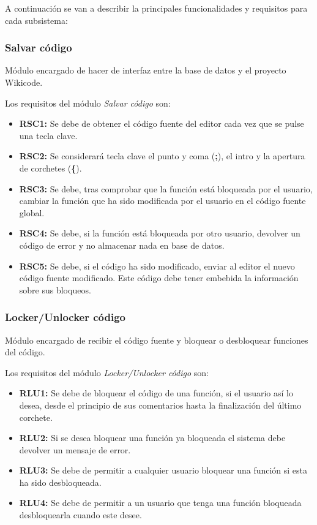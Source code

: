 A continuación se van a describir la principales funcionalidades y requisitos para cada subsistema:

\subsubsection{Salvar código}

Módulo encargado de hacer de interfaz entre la base de datos y el proyecto Wikicode. 

Los requisitos del módulo \emph{Salvar código} son:

\begin{itemize}
	\item \textbf{RSC1:} Se debe de obtener el código fuente del editor cada vez que se pulse una tecla clave.
	\item \textbf{RSC2:} Se considerará tecla clave el punto y coma (\textbf{;}), el intro y la apertura de corchetes (\textbf{\{}).
	\item \textbf{RSC3:} Se debe, tras comprobar que la función está bloqueada por el usuario, cambiar la función que ha sido modificada por el usuario en el código fuente global.
	\item \textbf{RSC4:} Se debe, si la función está bloqueada por otro usuario, devolver un código de error y no almacenar nada en base de datos.
	\item \textbf{RSC5:} Se debe, si el código ha sido modificado, enviar al editor el nuevo código fuente modificado. Este código debe tener embebida la información sobre sus bloqueos.
\end{itemize}

\subsubsection{Locker/Unlocker código}

Módulo encargado de recibir el código fuente y bloquear o desbloquear funciones del código.

Los requisitos del módulo \emph{Locker/Unlocker código} son:

\begin{itemize}
	\item \textbf{RLU1:} Se debe de bloquear el código de una función, si el usuario así lo desea, desde el principio de sus comentarios hasta la finalización del último corchete.
	\item \textbf{RLU2:} Si se desea bloquear una función ya bloqueada el sistema debe devolver un mensaje de error.
	\item \textbf{RLU3:} Se debe de permitir a cualquier usuario bloquear una función si esta ha sido desbloqueada.
	\item \textbf{RLU4:} Se debe de permitir a un usuario que tenga una función bloqueada desbloquearla cuando este desee.
\end{itemize}

